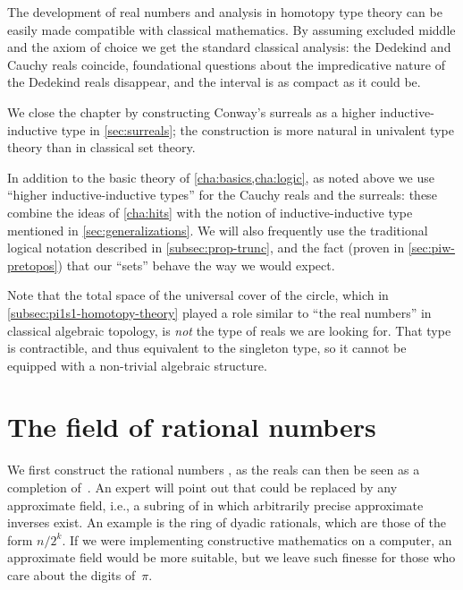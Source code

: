 The development of real numbers and analysis in homotopy type theory can be easily made compatible with classical mathematics. By assuming excluded middle and the axiom of choice we get the standard classical analysis: the Dedekind and Cauchy reals coincide, foundational questions about the impredicative nature of the Dedekind reals disappear, and the interval is as compact as it could be.

We close the chapter by constructing Conway's surreals as a higher inductive-inductive type in \autoref{sec:surreals};
the construction is more natural in univalent type theory than in  classical set theory.

In addition to the basic theory of \autoref{cha:basics,cha:logic}, as noted above we use ``higher inductive-inductive types'' for the Cauchy reals and the surreals: these combine the ideas of \autoref{cha:hits} with the notion of inductive-inductive type mentioned in \autoref{sec:generalizations}.
We will also frequently use the traditional logical notation described in \autoref{subsec:prop-trunc}, and the fact (proven in \autoref{sec:piw-pretopos}) that our ``sets'' behave the way we would expect.

Note that the total space of the universal cover of the circle, which
in \autoref{subsec:pi1s1-homotopy-theory} played a role similar to ``the real numbers'' in
classical algebraic topology, is \emph{not} the type of reals we are looking for. That
type is contractible, and thus equivalent to the singleton type, so it cannot be equipped
with a non-trivial algebraic structure.



\section{The field of rational numbers}
\label{sec:field-rati-numb}

%
%
We first construct the rational numbers \Q, as the reals can then be seen as a completion
of~\Q. An expert will point out that \Q could be replaced by any approximate field,
%
i.e., a subring of \Q in which arbitrarily precise approximate inverses exist. An example is the
ring of dyadic rationals, which are those of the form $n/2^k$. 
If we were implementing constructive mathematics on a computer,
an approximate field would be more suitable, but we leave such finesse for those
who care about the digits of~$\pi$.

